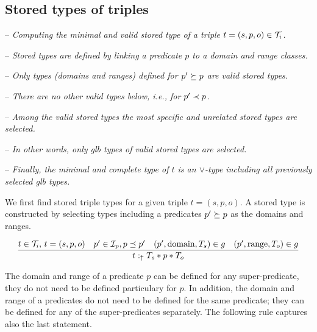 \documentclass[runningheads]{llncs}
\newcommand{\uarr}{\uparrow}
\newcommand{\I}{{\cal I}}
\newcommand{\T}{{\cal T}}
\newcommand{\memo}[1]{}
\newcommand{\notes}[1]{\noindent\begin{small}-- \emph{#1}\hfill\break\end{small}}
\newcommand{\nnotes}[1]{\indent\begin{small}-- \emph{#1}\hfill\break\end{small}}
\begin{document}
\memo{The types of $s$ and $o$ can be any classes $T_s$ and $T_o$ from
  ${\cal I}_c$, while the type of $p$ has to be a class $T_p$ that is
  a subclass of rdf:Property. The typing of a triple $t$ is correct
  since the interpretation of $T$ includes $t$.}

\memo{Moreover, the types $T$ that are derived by the above rule are
  minimal in the sense that given the information provided, i.e., the
  types of $t$'s components, their interpretations are minimal
  possible comparing them to the interpretations of all other derived
  types of $t$.}






\subsection{Stored types of triples}

\notes{Computing the minimal and valid stored type of a triple $t=(s,p,o)\in\T_i$.}
\nnotes{Stored types are defined by linking a predicate $p$ to a domain and range classes.}
\nnotes{Only types (domains and ranges) defined for $p'\succeq\/p$ are valid stored types.}
\nnotes{There are no other valid types below, i.e., for $p'\prec\/p$.}
\nnotes{Among the valid stored types the most specific and unrelated stored types are selected.}
\nnotes{In other words, only glb types of valid stored types are selected.}
\nnotes{Finally, the minimal and complete type of $t$ is an $\lor$-type including all previously selected glb types.}

We first find stored triple types for a given triple $t=(s,p,o)$. A
stored type is constructed by selecting types including a predicates
$p'\succeq\/p$ as the domains and ranges.

\begin{equation}
\label{rul:3-stored}
\dfrac{t\in\T_i,\, t=(s,p,o)\quad p'\in\I_p, p\preceq\/p'\quad (p',\text{domain},T_s)\in\/g\quad (p',\text{range},T_o)\in\/g}
      {t:_\uarr\/T_s*p*T_o}
\end{equation}

The domain and range of a predicate $p$ can be defined for any
super-predicate, they do not need to be defined particulary for
$p$. In addition, the domain and range of a predicates do not need to
be defined for the same predicate; they can be defined for any of the
super-predicates separately. The following rule captures also the last
statement.

\memo{
\medskip
\notes{Somewhere here, the inheritance should be noted.}
\notes{Inheritance should be treated in knowledge graphs!}
\notes{Predicates inherit in the same way as the classes.}
}
\end{document}
